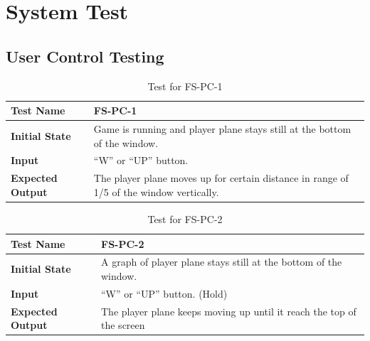 \documentclass[12,english]{article}
\begin{document}
\section{System Test}
	\subsection{User Control Testing}
	
		\begin{table}[!htbp]
			
			\begin{tabular}[r]{|l|l|}
				
				\hline
				
				\textbf{Test Name} & FS-PC-1 \\ 
				\hline
				\textbf{Initial State} & Game is running and player plane stays still at the bottom of the window. \\ 
				\hline
				\textbf{Input} & “W” or “UP” button. \\ 
				\hline 
				\textbf{Expected Output} & The player plane moves up for certain distance in range of 1/5 of the window vertically.  \\ 
				\hline
				
			\end{tabular}
			\caption{Test for FS-PC-1}
			\label{Table}
		\end{table}
		
		\begin{table}[!htbp]
			
			\begin{tabularx}{\textwidth}{|l|X|}
				
				\hline
				
				\textbf{Test Name} & FS-PC-2
				\\ 
				\hline
				\textbf{Initial State} & A graph of player plane stays still at the bottom of the window. \\ 
				\hline
				\textbf{Input} & “W” or “UP” button. (Hold)  \\ 
				\hline 
				\textbf{Expected Output} & The player plane keeps moving up until it reach the top of the screen \\ 
				\hline
				
			\end{tabularx}
			\caption{Test for FS-PC-2}
			\label{Table}
		\end{table}
\end{document}
